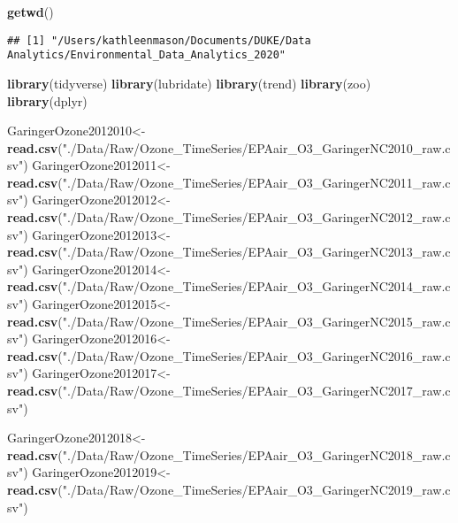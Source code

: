 \documentclass[]{article}
\newenvironment{Shaded}{\begin{snugshade}}{\end{snugshade}}
\newcommand{\KeywordTok}[1]{\textcolor[rgb]{0.13,0.29,0.53}{\textbf{#1}}}
\newcommand{\NormalTok}[1]{#1}
\newcommand{\StringTok}[1]{\textcolor[rgb]{0.31,0.60,0.02}{#1}}
\begin{document}
\begin{Shaded}
\begin{Highlighting}[]
\KeywordTok{getwd}\NormalTok{()}
\end{Highlighting}
\end{Shaded}

\begin{verbatim}
## [1] "/Users/kathleenmason/Documents/DUKE/Data Analytics/Environmental_Data_Analytics_2020"
\end{verbatim}

\begin{Shaded}
\begin{Highlighting}[]
\KeywordTok{library}\NormalTok{(tidyverse)}
\KeywordTok{library}\NormalTok{(lubridate)}
\KeywordTok{library}\NormalTok{(trend)}
\KeywordTok{library}\NormalTok{(zoo)}
\KeywordTok{library}\NormalTok{(dplyr)}

\NormalTok{GaringerOzone2012010<-}\KeywordTok{read.csv}\NormalTok{(}\StringTok{"./Data/Raw/Ozone_TimeSeries/EPAair_O3_GaringerNC2010_raw.csv"}\NormalTok{)}
\NormalTok{GaringerOzone2012011<-}\KeywordTok{read.csv}\NormalTok{(}\StringTok{"./Data/Raw/Ozone_TimeSeries/EPAair_O3_GaringerNC2011_raw.csv"}\NormalTok{)}
\NormalTok{GaringerOzone2012012<-}\KeywordTok{read.csv}\NormalTok{(}\StringTok{"./Data/Raw/Ozone_TimeSeries/EPAair_O3_GaringerNC2012_raw.csv"}\NormalTok{)}
\NormalTok{GaringerOzone2012013<-}\KeywordTok{read.csv}\NormalTok{(}\StringTok{"./Data/Raw/Ozone_TimeSeries/EPAair_O3_GaringerNC2013_raw.csv"}\NormalTok{)}
\NormalTok{GaringerOzone2012014<-}\KeywordTok{read.csv}\NormalTok{(}\StringTok{"./Data/Raw/Ozone_TimeSeries/EPAair_O3_GaringerNC2014_raw.csv"}\NormalTok{)}
\NormalTok{GaringerOzone2012015<-}\KeywordTok{read.csv}\NormalTok{(}\StringTok{"./Data/Raw/Ozone_TimeSeries/EPAair_O3_GaringerNC2015_raw.csv"}\NormalTok{)}
\NormalTok{GaringerOzone2012016<-}\KeywordTok{read.csv}\NormalTok{(}\StringTok{"./Data/Raw/Ozone_TimeSeries/EPAair_O3_GaringerNC2016_raw.csv"}\NormalTok{)}
\NormalTok{GaringerOzone2012017<-}\KeywordTok{read.csv}\NormalTok{(}\StringTok{"./Data/Raw/Ozone_TimeSeries/EPAair_O3_GaringerNC2017_raw.csv"}\NormalTok{)}


\NormalTok{GaringerOzone2012018<-}\KeywordTok{read.csv}\NormalTok{(}\StringTok{"./Data/Raw/Ozone_TimeSeries/EPAair_O3_GaringerNC2018_raw.csv"}\NormalTok{)}
\NormalTok{GaringerOzone2012019<-}\KeywordTok{read.csv}\NormalTok{(}\StringTok{"./Data/Raw/Ozone_TimeSeries/EPAair_O3_GaringerNC2019_raw.csv"}\NormalTok{)}
\end{Highlighting}
\end{Shaded}
\end{document}
